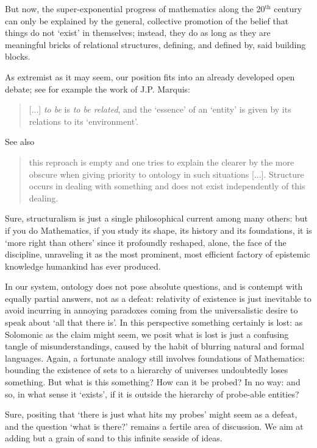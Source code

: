 But now, the super-exponential progress of mathematics along the 20$^\text{th}$ century can only be explained by the general, collective promotion of the belief that things do not `exist' in themselves; instead, they do as long as they are meaningful bricks of relational structures, defining, and defined by, said building blocks. 

As extremist as it may seem, our position fits into an already developed open debate; see for example the work of J.P. Marquis:
\begin{quote}
    [...] \emph{to be} is \emph{to be related}, and the `essence' of an `entity' is given by its relations to its `environment'.
    \hfill \cite{Marquis1997}
\end{quote}
See also
\begin{quote}
    this reproach is empty and one tries to explain the clearer by the more obscure when giving priority to ontology in such situations [...]. Structure occurs in dealing with something and does not exist independently of this dealing. \cite{kromer2007tool}
\end{quote}
Sure, structuralism is just a single philosophical current among many others: but if you do Mathematics, if you study its shape, its history and its foundations, it is `more right than others' since it profoundly reshaped, alone, the face of the discipline, unraveling it as the most prominent, most efficient factory of epistemic knowledge humankind has ever produced.

In our system, ontology does not pose absolute questions, and is contempt with equally partial answers, not as a defeat: relativity of existence is just inevitable to avoid incurring in annoying paradoxes coming from the universalistic desire to speak about `all that there is'. 
In this perspective something certainly is lost: as Solomonic as the claim might seem, we posit what is lost is just a confusing tangle of misunderstandings, caused by the habit of blurring natural and formal languages. Again, a fortunate analogy still involves foundations of Mathematics: bounding the existence of sets to a hierarchy of universes undoubtedly loses something. But what is this something? How can it be probed? In no way: and so, in what sense it `exists', if it is outside the hierarchy of probe-able entities?

Sure, positing that `there is just what hits my probes' might seem as a defeat, and the question `what is there?' remains a fertile area of discussion. We aim at adding but a grain of sand to this infinite seaside of ideas. 

